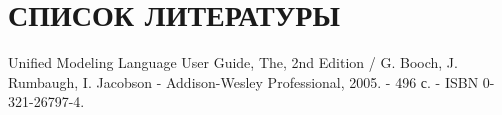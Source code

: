 \section*{СПИСОК ЛИТЕРАТУРЫ}

\vspace{1\baselineskip} 


\begin{thebibliography}{9}
    
    Unified Modeling Language User Guide, The, 2nd Edition
    / G. Booch, J. Rumbaugh, I. Jacobson - Addison-Wesley Professional, 2005. - 496 с. - ISBN 0-321-26797-4.
    
\end{thebibliography}

%
%
%
%
